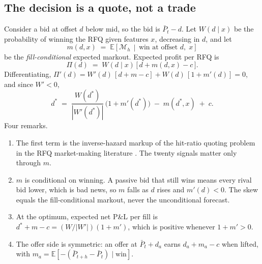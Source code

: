 \documentclass[11pt,letterpaper]{article}
\newcommand{\E}{\mathbb{E}}
\newcommand{\Pm}{\bar{P}}                 %
\begin{document}
\subsection{The decision is a quote, not a trade}
Consider a bid at offset $d$ below mid, so the bid is $\Pm_t-d$. Let $W(d\mid x)$ be the probability of winning the RFQ given features $x$, decreasing in $d$, and let
\[
m(d,x) \;=\; \E\!\left[\mathcal{M}_h \,\middle|\, \text{win at offset } d,\; x\right]
\]
be the \emph{fill-conditional} expected markout. Expected profit per RFQ is
\begin{equation}
\Pi(d) \;=\; W(d\mid x)\,\bigl[\,d + m(d,x) - c\,\bigr].
\label{eq:quote}
\end{equation}
Differentiating, $\Pi'(d)=W'(d)\,[d+m-c]+W(d)\,[1+m'(d)]=0$, and since $W'<0$,
\begin{equation}
d^{*} \;=\; \frac{W(d^{*})}{|W'(d^{*})|}\,\bigl(1+m'(d^{*})\bigr) \;-\; m(d^{*},x) \;+\; c .
\label{eq:foc}
\end{equation}
Four remarks.
\begin{enumerate}[itemsep=2pt,topsep=2pt]
\item The first term is the inverse-hazard markup of the hit-ratio quoting problem in the RFQ market-making literature \cite{hitratio2026,bg2023}. The twenty signals matter only through $m$.
\item $m$ is conditional on winning. A passive bid that still wins means every rival bid lower, which is bad news, so $m$ falls as $d$ rises and $m'(d)<0$. The skew equals the fill-conditional markout, never the unconditional forecast.
\item At the optimum, expected net P\&L per fill is $d^{*}+m-c=(W/|W'|)(1+m')$, which is positive whenever $1+m'>0$.
\item The offer side is symmetric: an offer at $\Pm_t+d_a$ earns $d_a+m_a-c$ when lifted, with $m_a=\E[-(\Pm_{t+h}-\Pm_t)\mid \text{win}]$.
\end{enumerate}
\end{document}
